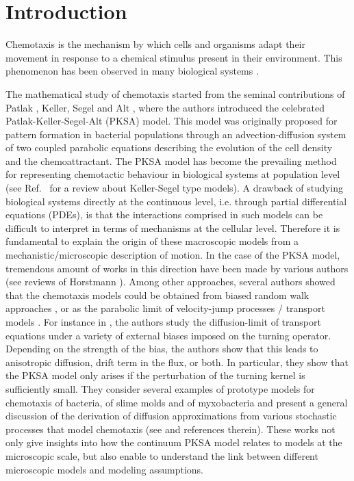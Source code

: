 \documentclass{aims} %
\theoremstyle{definition}
\begin{document}

\section{Introduction}

Chemotaxis is the mechanism by which cells and organisms adapt their movement in response to a chemical stimulus present in their environment. This phenomenon has been observed in many biological systems \cite{Alt1980,Kaupp2012,Jin2008,Roussos2011}. 

{The mathematical study of chemotaxis started from the seminal contributions of Patlak \cite{patlak1953random}, Keller, Segel and Alt \cite{keller1970initiation,keller1971model,Alt1980}, where the authors introduced the celebrated Patlak-Keller-Segel-Alt (PKSA) model. This model was originally proposed for pattern formation in bacterial populations through an advection-diffusion system of two coupled parabolic equations describing the evolution of the cell density and the chemoattractant. The PKSA model has become the prevailing method for representing chemotactic behaviour in biological systems at population level (see Ref.~\cite{Hillen2009} for a review about Keller-Segel type models). A drawback of studying biological systems directly at the continuous level, i.e. through partial differential equations (PDEs), is that the interactions comprised in such models can be difficult to interpret in terms of mechanisms at the cellular level. Therefore it is fundamental to explain the origin of these macroscopic models from a mechanistic/microscopic description of motion. In the case of the PKSA model, tremendous amount of works in this direction have been made by various authors (see reviews of Horstmann \cite{horstmann2003,horstmann2004}). Among other approaches, several authors showed that the chemotaxis models could be obtained from biased random walk approaches \cite{Alt1980, Othmer1997}, or as the parabolic limit of velocity-jump processes / transport models \cite{othmer2000diffusion,othmer2002diffusion,chalub2004kinetic}. For instance in \cite{othmer2002diffusion}, the authors study the diffusion-limit of transport equations under a variety of external biases imposed on the turning operator. Depending on the strength of the bias, the authors show that this leads to anisotropic diffusion, drift term in the flux, or both. In particular, they show that the PKSA model only arises if the perturbation of the turning kernel is sufficiently small. They consider several examples of prototype models for chemotaxis of bacteria, of slime molds and of myxobacteria and present a general discussion of the derivation of diffusion approximations from various stochastic processes that model chemotaxis (see \cite{othmer2000diffusion} and references therein). These works not only give insights into how the continuum PKSA model relates to models at the microscopic scale, but also enable to understand the link between different microscopic models and modeling assumptions.

}
\end{document}
